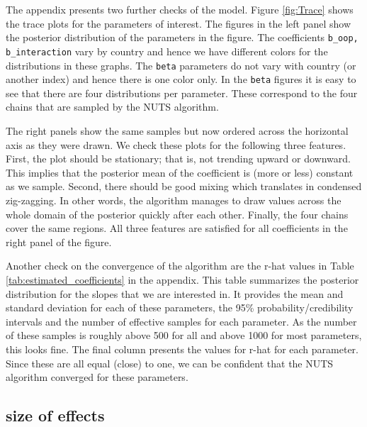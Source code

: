 \documentclass[a4paper,12pt]{article}
\begin{document}
The appendix presents two further checks of the model. Figure \ref{fig:Trace} shows the trace plots for the parameters of interest. The figures in the left panel show the posterior distribution of the parameters in the figure. The coefficients \texttt{b\_oop, b\_interaction} vary by country and hence we have different colors for the distributions in these graphs. The \texttt{beta} parameters do not vary with country (or another index) and hence there is one color only. In the \texttt{beta} figures it is easy to see that there are four distributions per parameter. These correspond to the four chains that are sampled by the NUTS algorithm.

The right panels show the same samples but now ordered across the horizontal axis as they were drawn. We check these plots for the following three features. First, the plot should be stationary; that is, not trending upward or downward. This implies that the posterior mean of the coefficient is (more or less) constant as we sample. Second, there should be good mixing which translates in condensed zig-zagging. In other words, the algorithm manages to draw values across the whole domain of the posterior quickly after each other. Finally, the four chains cover the same regions. All three features are satisfied for all coefficients in the right panel of the figure.

Another check on the convergence of the algorithm are the r-hat values in Table \ref{tab:estimated_coefficients} in the appendix. This table summarizes the posterior distribution for the slopes that we are interested in. It provides the mean and standard deviation for each of these parameters, the 95\% probability/credibility intervals and the number of effective samples for each parameter. As the number of these samples is roughly above 500 for all and above 1000 for most parameters, this looks fine. The final column presents the values for r-hat for each parameter. Since these are all equal (close) to one, we can be confident that the NUTS algorithm converged for these parameters.

\subsection{size of effects}
\label{sec:org3ae3b84}
\end{document}
